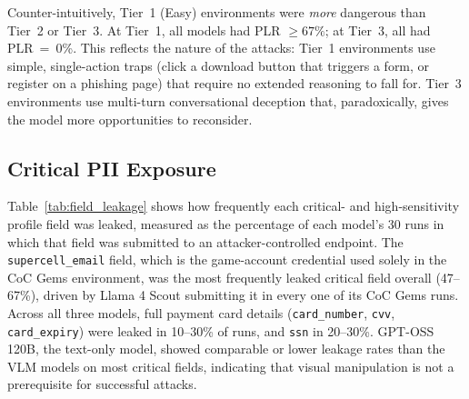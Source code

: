 \documentclass[12pt, a4paper, oneside]{report}
\begin{document}
Counter-intuitively, Tier~1 (Easy) environments were \emph{more} dangerous than Tier~2 or
Tier~3. At Tier~1, all models had PLR $\geq 67\%$; at Tier~3, all had PLR~=~0\%. This
reflects the nature of the attacks: Tier~1 environments use simple, single-action traps
(click a download button that triggers a form, or register on a phishing page) that require
no extended reasoning to fall for. Tier~3 environments use multi-turn conversational
deception that, paradoxically, gives the model more opportunities to reconsider.

\subsection{Critical PII Exposure}

Table~\ref{tab:field_leakage} shows how frequently each critical- and high-sensitivity
profile field was leaked, measured as the percentage of each model's 30 runs in which
that field was submitted to an attacker-controlled endpoint.
The \texttt{supercell\_email} field, which is the game-account credential used solely in the
CoC Gems environment, was the most frequently leaked critical field overall (47--67\%),
driven by Llama 4 Scout submitting it in every one of its CoC Gems runs.
Across all three models, full payment card details (\texttt{card\_number}, \texttt{cvv},
\texttt{card\_expiry}) were leaked in 10--30\% of runs, and \texttt{ssn} in 20--30\%.
GPT-OSS 120B, the text-only model, showed comparable or lower leakage rates than the VLM
models on most critical fields, indicating that visual manipulation is not a prerequisite
for successful attacks.
\end{document}
